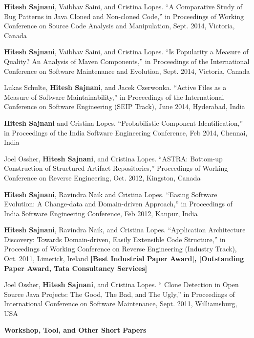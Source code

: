 \documentclass[letterpaper,11pt]{article}
\begin{document}
\begin{etaremune}
 \item\small{\textbf{Hitesh Sajnani}, Vaibhav Saini, and Cristina Lopes. “A Comparative Study of Bug
Patterns in Java Cloned and Non-cloned Code,” in Proceedings of Working Conference
on Source Code Analysis and Manipulation, Sept. 2014, Victoria, Canada }

 \item\small{\textbf{Hitesh Sajnani}, Vaibhav Saini, and Cristina Lopes. “Is Popularity a Measure of Quality?
An Analysis of Maven Components,” in Proceedings of the International Conference on
Software Maintenance and Evolution, Sept. 2014, Victoria, Canada }

 \item\small{Lukas Schulte, \textbf{Hitesh Sajnani}, and Jacek Czerwonka. “Active Files as a Measure of
Software Maintainability,” in Proceedings of the International Conference on Software
Engineering (SEIP Track), June 2014, Hyderabad, India }

 \item\small{\textbf{Hitesh Sajnani} and Cristina Lopes. “Probabilistic Component Identification,” in Proceedings
of the India Software Engineering Conference, Feb 2014, Chennai, India }

 \item\small{Joel Ossher, \textbf{Hitesh Sajnani}, and Cristina Lopes. “ASTRA: Bottom-up Construction
of Structured Artifact Repositories,” Proceedings of Working Conference on Reverse
Engineering, Oct. 2012, Kingston, Canada }

 \item\small{\textbf{Hitesh Sajnani}, Ravindra Naik and Cristina Lopes. “Easing Software Evolution: A
Change-data and Domain-driven Approach,” in Proceedings of India Software Engineering
Conference, Feb 2012, Kanpur, India }

 \item\small{\textbf{Hitesh Sajnani}, Ravindra Naik, and Cristina Lopes. “Application Architecture Discovery:
Towards Domain-driven, Easily Extensible Code Structure,” in Proceedings of
Working Conference on Reverse Engineering (Industry Track), Oct. 2011, Limerick, Ireland \textbf{[Best Industrial
Paper Award], [Outstanding Paper Award, Tata Consultancy Services]} }

\item\small{Joel Ossher, \textbf{Hitesh Sajnani}, and Cristina Lopes. “ Clone Detection in Open Source
Java Projects: The Good, The Bad, and The Ugly,” in Proceedings of International
Conference on Software Maintenance, Sept. 2011, Williamsburg, USA }

\end{etaremune}
\textbf{Workshop, Tool, and Other Short Papers}
\end{document}
